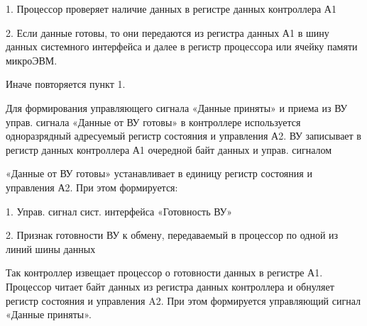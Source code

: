 \documentclass{article}
\begin{document}
1. Процессор проверяет наличие данных в регистре данных контроллера А1

2. Если данные готовы, то они передаются из регистра данных А1 в шину данных системного интерфейса и далее в регистр процессора или ячейку памяти микроЭВМ. 

Иначе повторяется пункт 1.

Для формирования управляющего сигнала «Данные приняты» и приема из ВУ управ. сигнала «Данные от ВУ готовы» в контроллере используется одноразрядный адресуемый регистр состояния и управления А2.
ВУ записывает в регистр данных контроллера А1 очередной байт данных и управ. сигналом

«Данные от ВУ готовы» устанавливает в единицу регистр состояния и управления А2. При этом формируется:

1. Управ. сигнал сист. интерфейса «Готовность ВУ»

2. Признак готовности ВУ к обмену, передаваемый в процессор по одной из линий шины
данных

Так контроллер извещает процессор о готовности данных в регистре А1. Процессор читает байт данных из регистра данных контроллера и обнуляет регистр состояния и управления
A2. При этом формируется управляющий сигнал «Данные приняты».
\end{document}
